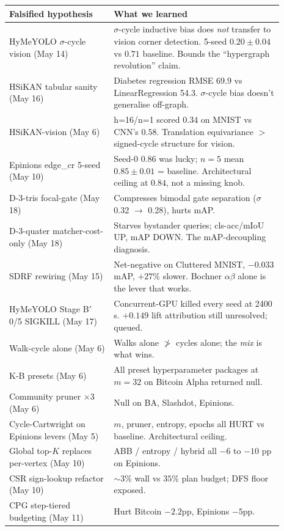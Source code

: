 \documentclass[11pt,a4paper]{article}
\theoremstyle{plain}
\theoremstyle{definition}
\begin{document}
\begin{center}\footnotesize
\begin{tabular}{p{0.34\linewidth} p{0.55\linewidth}}
\toprule
Falsified hypothesis & What we learned \\
\midrule
HyMeYOLO $\sigma$-cycle vision (May 14) & $\sigma$-cycle inductive
  bias does \emph{not} transfer to vision corner detection. 5-seed
  $0.20 \pm 0.04$ vs $0.71$ baseline. Bounds the
  ``hypergraph revolution'' claim. \\
HSiKAN tabular sanity (May 16) & Diabetes regression RMSE 69.9 vs
  LinearRegression 54.3. $\sigma$-cycle bias doesn't generalise off-graph. \\
HSiKAN-vision (May 6) & h=16/n=1 scored $0.34$ on MNIST vs CNN's
  $0.58$. Translation equivariance $>$ signed-cycle structure for
  vision. \\
Epinions edge\_cr 5-seed (May 10) & Seed-0 $0.86$ was lucky;
  $n{=}5$ mean $0.85 \pm 0.01$ = baseline. Architectural ceiling
  at $0.84$, not a missing knob. \\
D-3-tris focal-gate (May 18) & Compresses bimodal gate separation
  ($\sigma$ 0.32 $\to$ 0.28), hurts mAP. \\
D-3-quater matcher-cost-only (May 18) & Starves bystander
  queries; cls-acc/mIoU UP, mAP DOWN. The mAP-decoupling diagnosis. \\
SDRF rewiring (May 15) & Net-negative on Cluttered MNIST, $-0.033$
  mAP, $+27\%$ slower. Bochner $\alpha\beta$ alone is the lever
  that works. \\
HyMeYOLO Stage B$'$ 0/5 SIGKILL (May 17) & Concurrent-GPU killed
  every seed at 2400 s. $+0.149$ lift attribution still
  unresolved; queued. \\
Walk-cycle alone (May 6) & Walks alone $\not >$ cycles alone; the
  \emph{mix} is what wins. \\
K-B presets (May 6) & All preset hyperparameter packages at
  $m{=}32$ on Bitcoin Alpha returned null. \\
Community pruner $\times 3$ (May 6) & Null on BA, Slashdot, Epinions. \\
Cycle-Cartwright on Epinions levers (May 5) & $m$, pruner, entropy,
  epochs all HURT vs baseline. Architectural ceiling. \\
Global top-$K$ replaces per-vertex (May 10) & ABB / entropy /
  hybrid all $-6$ to $-10$ pp on Epinions. \\
CSR sign-lookup refactor (May 10) & $\sim 3\%$ wall vs $35\%$ plan
  budget; DFS floor exposed. \\
CPG step-tiered budgeting (May 11) & Hurt Bitcoin $-2.2$pp, Epinions $-5$pp. \\
\bottomrule
\end{tabular}
\end{center}
\end{document}
